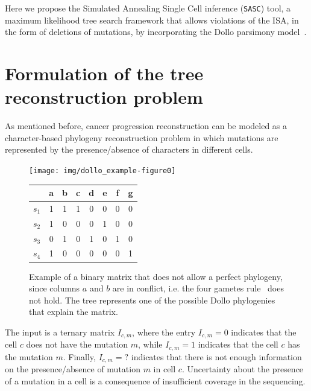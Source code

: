 \documentclass[a4paper,USenglish]{article}
\theoremstyle{definition}
\begin{document}
Here we propose the Simulated Annealing Single Cell inference (\texttt{SASC}) tool, a maximum likelihood tree search framework that allows violations of the ISA, in the form of deletions of mutations, by incorporating the Dollo parsimony model~\cite{Farris_1977}.

\section{Formulation of the tree reconstruction problem}
As mentioned before, cancer progression reconstruction can be modeled as a
character-based phylogeny reconstruction problem in which mutations
are represented by the presence/absence of characters in different 
cells.


\begin{figure}[tb!]
  \begin{minipage}[c]{0.55\textwidth}
     \texttt{[image: img/dollo\_example-figure0]}
\end{minipage}
\begin{minipage}[t]{0.3\textwidth}
        \begin{tabular}[!t]{c|ccccccc}
             & a & b & c & d & e & f & g  \\ \hline
            $s_1$ & 1 & 1 & 1 & 0 & 0 & 0 & 0 \\
            $s_2$ & 1 & 0 & 0 & 0 & 1 & 0 & 0 \\
            $s_3$ & 0 & 1 & 0 & 1 & 0 & 1 & 0 \\
            $s_4$ & 1 & 0 & 0 & 0 & 0 & 0 & 1
        \end{tabular}
        \end{minipage}
  \caption{Example of a binary matrix that does not allow a perfect phylogeny, since columns $a$ and $b$ are in conflict, i.e. the four gametes rule~\cite{gusfield1991}
  does not hold. The tree represents one of the possible Dollo phylogenies that explain the matrix.}
\label{fig:dollo}
\end{figure}

The input is a ternary matrix $I_{c,m}$, where the entry $I_{c,m}=0$ indicates
that the cell $c$ does not have the mutation $m$, while $I_{c,m}=1$ indicates that the
cell $c$ has the mutation $m$.
Finally, $I_{c,m}=?$ indicates
that there is not enough information on the presence/absence of mutation $m$ in cell $c$.
Uncertainty about the presence of a mutation in a cell is a consequence of insufficient coverage in the sequencing. 
\end{document}
